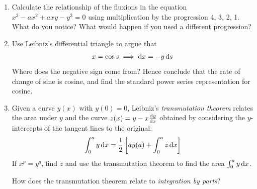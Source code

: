 \begin{exercises}{}{}
\begin{enumerate}
	

	
	
	\item%
	Calculate the relationship of the fluxions in the equation $x^3-ax^2+axy-y^3=0$ using multiplication by the progression 4, 3, 2, 1. What do you notice? What would happen if you used a different progression?
	
	
	\item Use Leibniz's differential triangle to argue that
	\[
		x=\cos s\implies \dx=-y\,\ds
	\]
	Where does the negative sign come from? Hence conclude that the rate of change of sine is cosine, and find the standard power series representation for cosine.
	

	\item%
	Given a curve $y(x)$ with $y(0)=0$, Leibniz's \emph{transmutation theorem} relates the area under $y$ and the curve $z(x)=y-x\diff[y]{x}$ obtained by considering the $y$-intercepts of the tangent lines to the original:
	\[
		\int_0^a y\,\dx=\frac 12\left[ay(a)+\int_0^a z\,\dx\right]
	\]
	If $x^p=y^q$, find $z$ and use the transmutation theorem to find the area $\int_0^a y\,\dx$.\par
	How does the transmutation theorem relate to \emph{integration by parts}?
	

\end{enumerate}
\end{exercises}
